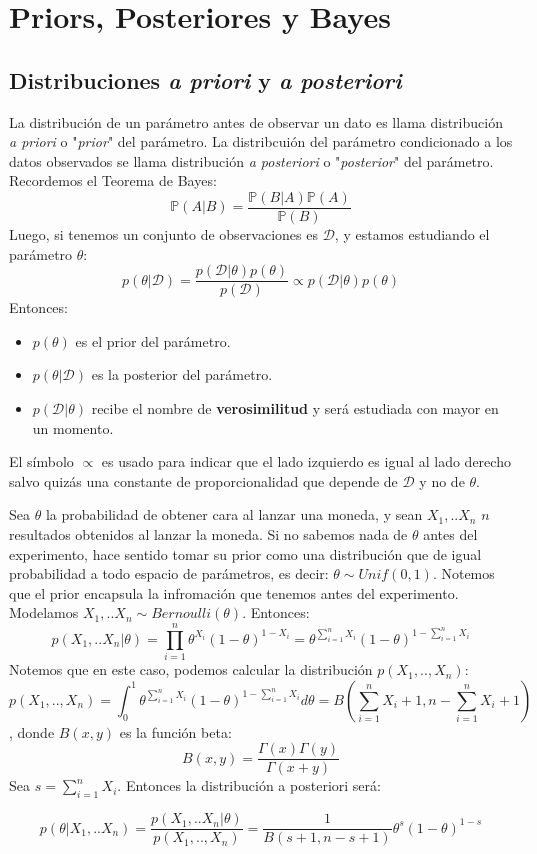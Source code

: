 \chapter{Priors, Posteriores y Bayes}


\section{Distribuciones \emph{a priori} y \emph{a posteriori}}

La distribución de un parámetro antes de observar un dato es llama distribución \emph{ a priori} o "\emph{prior}" del parámetro. La distribcuión del parámetro condicionado a los datos observados se llama distribución \emph{ a posteriori} o "\emph{posterior}" del parámetro.\\
Recordemos el Teorema de Bayes:
$$
\mathbb{P}(A|B)=\dfrac{ \mathbb{P}(B | A) \mathbb{P}(A)}{\mathbb{P}(B)}
$$
Luego, si tenemos un conjunto de observaciones es $\mathcal{D}$, y estamos estudiando el parámetro $\theta$:
$$
p(\theta|\mathcal{D})=\frac{p(\mathcal{D}|\theta) p(\theta)}{p(\mathcal{D})} \propto p(\mathcal{D}|\theta) p(\theta)
$$
Entonces: 
\begin{itemize}
    \item $p(\theta)$ es el prior del parámetro.
    \item $p(\theta|\mathcal{D})$ es la posterior del parámetro. 
    \item $p(\mathcal{D}|\theta)$ recibe el nombre de \textbf{verosimilitud} y será estudiada con mayor en un momento. 
\end{itemize}
El símbolo $\propto$ es usado para indicar que el lado izquierdo es igual al lado derecho salvo quizás una constante de proporcionalidad que depende de $\mathcal{D}$ y no de $\theta$. 

\begin{example} Sea $\theta$ la probabilidad de obtener cara al lanzar una moneda, y sean $X_1,..X_n$ $n$ resultados obtenidos al lanzar la moneda. Si no sabemos nada de $\theta$ antes del experimento, hace sentido tomar su prior como una distribución que de igual probabilidad a todo espacio de parámetros, es decir: $\theta \sim Unif(0,1)$. Notemos que el prior encapsula la infromación que tenemos antes del experimento. Modelamos $X_1,..X_n \sim Bernoulli(\theta)$. Entonces: 
$$
p(X_1,..X_n|\theta)=\prod_{i=1}^{n} \theta^{X_i} (1-\theta)^{1-X_i} = 
\theta^{\sum_{i=1}^{n} X_i} (1-\theta)^{1-\sum_{i=1}^{n}X_i}
$$
Notemos que en este caso, podemos calcular la distribución $p(X_1,..,X_n)$:
$$
p(X_1,..,X_n)=\int_{0}^{1} \theta^{\sum_{i=1}^{n} X_i} (1-\theta)^{1-\sum_{i=1}^{n}X_i} d\theta = B(\sum_{i=1}^{n} X_i +1 , n- \sum_{i=1}^{n} X_i +1 )
$$,
donde $B(x,y)$ es la función beta:
$$
B(x,y)=\dfrac{\Gamma(x)\Gamma(y)}{\Gamma(x+y)}
$$
Sea $s= \sum_{i=1}^{n}X_i$. Entonces la distribución a posteriori será:

$$
p(\theta|X_1,..X_n)= \dfrac{p(X_1,..X_n|\theta)}{p(X_1,..,X_n)} = \dfrac{1}{B(s+1,n-s+1)} \theta^{s} (1-\theta)^{1-s}
$$

\end{example} 

